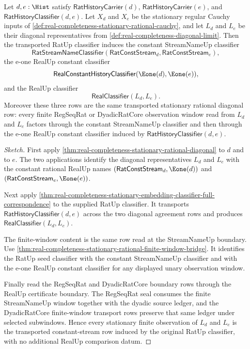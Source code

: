 \begin{theorem}
\label{thm:real-completeness-transported-stationary-diagonal}
Let $d,e:\Hist$ satisfy $\mathsf{RatHistoryCarrier}(d)$,
$\mathsf{RatHistoryCarrier}(e)$, and
$\mathsf{RatHistoryClassifier}(d,e)$. Let $X_d$ and $X_e$ be the stationary
regular Cauchy inputs of
\autoref{def:real-completeness-stationary-rational-cauchy}, and let $L_d$ and
$L_e$ be their diagonal representatives from
\autoref{def:real-completeness-diagonal-limit}. Then the transported RatUp
classifier induces the constant StreamNameUp classifier
$$
\mathsf{RatStreamNameClassifier}(\mathsf{RatConstStream}_d,\mathsf{RatConstStream}_e),
$$
the e-one RealUp constant classifier
$$
\mathsf{RealConstantHistoryClassifier}(\Eone(d),\Eone(e)),
$$
and the RealUp classifier
$$
\mathsf{RealClassifier}(L_d,L_e).
$$
Moreover these three rows are the same transported stationary rational
diagonal row: every finite RegSeqRat or DyadicRatCore observation window read
from $L_d$ and $L_e$ factors through the constant StreamNameUp classifier and
then through the e-one RealUp constant classifier induced by
$\mathsf{RatHistoryClassifier}(d,e)$.
\end{theorem}

\begin{proof}[Sketch]
First apply
\autoref{thm:real-completeness-stationary-rational-diagonal} to $d$ and to
$e$. The two applications identify the diagonal representatives $L_d$ and
$L_e$ with the constant rational RealUp names
$(\mathsf{RatConstStream}_d,\Eone(d))$ and
$(\mathsf{RatConstStream}_e,\Eone(e))$.

Next apply
\autoref{thm:real-completeness-stationary-embedding-classifier-full-correspondence}
to the supplied RatUp classifier. It transports
$\mathsf{RatHistoryClassifier}(d,e)$ across the two diagonal agreement rows
and produces $\mathsf{RealClassifier}(L_d,L_e)$.

The finite-window content is the same row read at the StreamNameUp boundary.
Use \autoref{thm:real-completeness-stationary-rational-finite-window-bridge}.
It identifies the RatUp seed classifier with the constant StreamNameUp
classifier and with the e-one RealUp constant classifier for any displayed
unary observation window.

Finally read the RegSeqRat and DyadicRatCore boundary rows through the RealUp
certificate boundary. The RegSeqRat seal consumes the finite StreamNameUp
window together with the dyadic source ledger, and the DyadicRatCore
finite-window transport rows preserve that same ledger under selected
subwindows. Hence every stationary finite observation of $L_d$ and $L_e$
is the transported constant-stream row induced by the original RatUp
classifier, with no additional RealUp comparison datum.
\end{proof}

